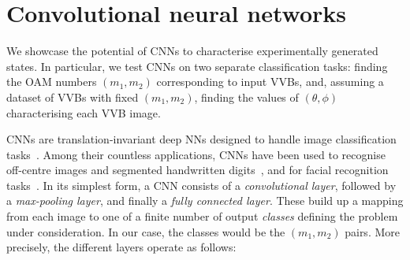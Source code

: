 \section{Convolutional neural networks}
\label{sec:VVBs:CNNs}

We showcase the potential of \acp{CNN} to characterise experimentally generated states.
In particular, we test CNNs on two separate classification tasks:
finding the OAM numbers $(m_1,m_2)$ corresponding to input VVBs, and, assuming a dataset of VVBs with fixed $(m_1,m_2)$, finding the values of $(\theta,\phi)$ characterising each VVB image.

\acp{CNN} are translation-invariant deep NNs designed to handle image classification tasks~\cite{lecun2015deep}. Among their countless applications, CNNs have been used to recognise off-centre images and segmented handwritten digits~\cite{simard2003best,ciresan2011flexible},
and for facial recognition tasks~\cite{matsugu2003subject}.
In its simplest form, a \ac{CNN} consists of a \emph{convolutional layer},
followed by a \emph{max-pooling layer}, and finally a \emph{fully connected layer}.
These build up a mapping from each image to one of a finite number of output \emph{classes} defining the problem under consideration. In our case, the classes would be the $(m_1,m_2)$ pairs.
More precisely, the different layers operate as follows:
